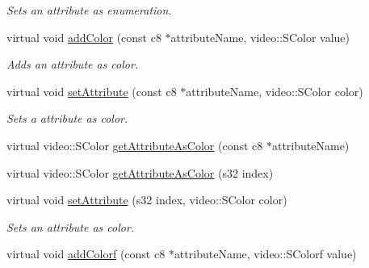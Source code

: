 \begin{DoxyCompactItemize}
\begin{DoxyCompactList}\small\item\em Sets an attribute as enumeration. \end{DoxyCompactList}\item 
\hypertarget{classirr_1_1io_1_1_c_attributes_a7b0a34fc237d6e22979d8d4b26a06b02}{virtual void \hyperlink{classirr_1_1io_1_1_c_attributes_a7b0a34fc237d6e22979d8d4b26a06b02}{add\-Color} (const c8 $\ast$attribute\-Name, video\-::\-S\-Color value)}\label{classirr_1_1io_1_1_c_attributes_a7b0a34fc237d6e22979d8d4b26a06b02}

\begin{DoxyCompactList}\small\item\em Adds an attribute as color. \end{DoxyCompactList}\item 
\hypertarget{classirr_1_1io_1_1_c_attributes_a776cc316535d6d145254289af59af0d5}{virtual void \hyperlink{classirr_1_1io_1_1_c_attributes_a776cc316535d6d145254289af59af0d5}{set\-Attribute} (const c8 $\ast$attribute\-Name, video\-::\-S\-Color color)}\label{classirr_1_1io_1_1_c_attributes_a776cc316535d6d145254289af59af0d5}

\begin{DoxyCompactList}\small\item\em Sets a attribute as color. \end{DoxyCompactList}\item 
virtual video\-::\-S\-Color \hyperlink{classirr_1_1io_1_1_c_attributes_a6b55e30576371041628fd3fcdd2a81e6}{get\-Attribute\-As\-Color} (const c8 $\ast$attribute\-Name)
\item 
virtual video\-::\-S\-Color \hyperlink{classirr_1_1io_1_1_c_attributes_ac014dd88e619781e96b474475c1a6b36}{get\-Attribute\-As\-Color} (s32 index)
\item 
virtual void \hyperlink{classirr_1_1io_1_1_c_attributes_a7ed268a6b14261f9e5f629f4de2d084d}{set\-Attribute} (s32 index, video\-::\-S\-Color color)
\begin{DoxyCompactList}\small\item\em Sets an attribute as color. \end{DoxyCompactList}\item 
\hypertarget{classirr_1_1io_1_1_c_attributes_a4a0bdb94bce8eea68db7e1f2d9bf0a56}{virtual void \hyperlink{classirr_1_1io_1_1_c_attributes_a4a0bdb94bce8eea68db7e1f2d9bf0a56}{add\-Colorf} (const c8 $\ast$attribute\-Name, video\-::\-S\-Colorf value)}\label{classirr_1_1io_1_1_c_attributes_a4a0bdb94bce8eea68db7e1f2d9bf0a56}


\end{DoxyCompactItemize}
